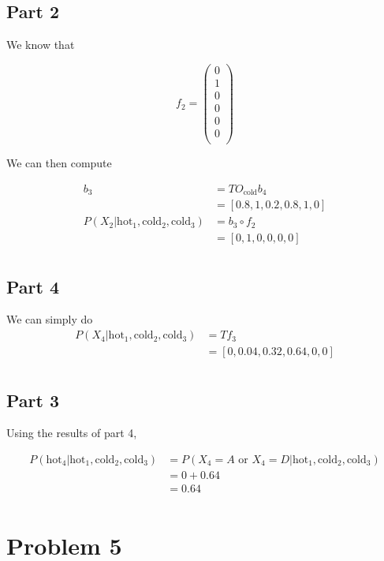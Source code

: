 \documentclass[12pt]{article}
\begin{document}
\subsection{Part 2}

We know that

$$
f_2 = \begin{pmatrix}
    0 \\
    1 \\
    0 \\
    0 \\
    0 \\
    0 \\
    \end{pmatrix}
$$

We can then compute

\begin{align*}
    b_3 &= T O_{\text{cold}} b_4 \\
    &= [0.8, 1, 0.2, 0.8, 1, 0] \\
    P(X_2 | \text{hot}_1, \text{cold}_2, \text{cold}_3) &= b_3 \circ f_2 \\
    &= [0, 1, 0, 0, 0, 0] \\
\end{align*}

\setcounter{subsection}{3}
\subsection{Part 4}

We can simply do
\begin{align*}
    P(X_4 | \text{hot}_1, \text{cold}_2, \text{cold}_3) &= T f_3 \\
    &= [0, 0.04, 0.32, 0.64, 0, 0] \\
\end{align*}

\setcounter{subsection}{2}
\subsection{Part 3}

Using the results of part 4,

\begin{align*}
    P(\text{hot}_4 | \text{hot}_1, \text{cold}_2, \text{cold}_3) &= P(X_4 = A \text{ or } X_4 = D | \text{hot}_1, \text{cold}_2, \text{cold}_3) \\
    &= 0 + 0.64 \\
    &= 0.64 \\
\end{align*}


\section{Problem 5}
\end{document}
